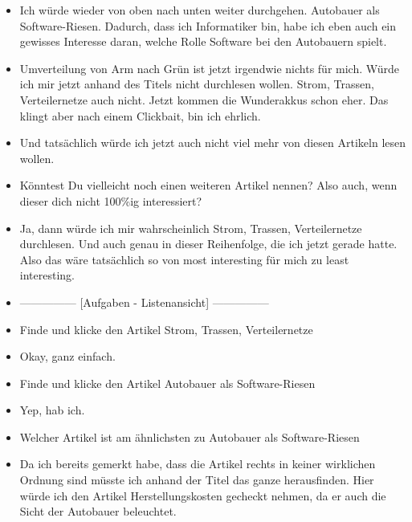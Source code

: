 {\begin{itemize}[]
              Also \flqq Fürs Klima und gegen China\frqq{} würde ich mir durchlesen, weil ich das gut finde, wenn wir halt vielleicht nicht so abhängig sind von anderen Staaten, was E-Mobilität angeht.
        \item {} Ich würde wieder von oben nach unten weiter durchgehen.
              \flqq Autobauer als Software-Riesen\frqq{}.
              Dadurch, dass ich Informatiker bin, habe ich eben auch ein gewisses Interesse daran, welche Rolle Software bei den Autobauern spielt.
        \item {} \flqq Umverteilung von Arm nach Grün\frqq{} ist jetzt irgendwie nichts für mich. Würde ich mir jetzt anhand des Titels nicht durchlesen wollen.
              \flqq Strom, Trassen, Verteilernetze\frqq{} auch nicht.
              \flqq Jetzt kommen die Wunderakkus\frqq{} schon eher.
              Das klingt aber nach einem Clickbait, bin ich ehrlich.
        \item {} Und tatsächlich würde ich jetzt auch nicht viel mehr von diesen Artikeln lesen wollen.
        \item {} Könntest Du vielleicht noch einen weiteren Artikel nennen? Also auch, wenn dieser dich nicht 100\%ig interessiert?
        \item {} Ja, dann würde ich mir wahrscheinlich \flqq Strom, Trassen, Verteilernetze\frqq{} durchlesen.
              Und auch genau in dieser Reihenfolge, die ich jetzt gerade hatte.
              Also das wäre tatsächlich so von most interesting für mich zu least interesting.
        \item {---------------} [Aufgaben - Listenansicht] {---------------}
        \item {} Finde und klicke den Artikel \flqq Strom, Trassen, Verteilernetze\frqq{}
        \item {} Okay, ganz einfach.
        \item {} Finde und klicke den Artikel \flqq Autobauer als Software-Riesen\frqq{}
        \item {} Yep, hab ich.
        \item {} Welcher Artikel ist am ähnlichsten zu \flqq Autobauer als Software-Riesen\frqq{}
        \item {} Da ich bereits gemerkt habe, dass die Artikel rechts in keiner wirklichen Ordnung sind müsste ich anhand der Titel das ganze herausfinden.
        Hier würde ich den Artikel \flqq Herstellungskosten gecheckt\frqq{} nehmen, da er auch die Sicht der Autobauer beleuchtet.

\end{itemize}}

